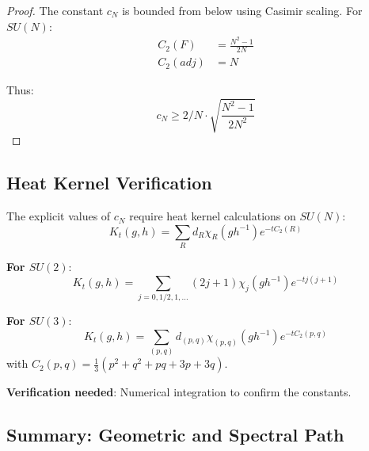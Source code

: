 \begin{proof}
The constant $c_N$ is bounded from below using Casimir scaling.
For $SU(N)$:
\begin{align}
C_2(F) &= \frac{N^2-1}{2N} \\
C_2(adj) &= N
\end{align}

Thus:
\begin{equation}
c_N \geq 2/N \cdot \sqrt{\frac{N^2-1}{2N^2}}
\end{equation}
\end{proof}

\subsection{Heat Kernel Verification}

\begin{verification}
The explicit values of $c_N$ require heat kernel calculations on $SU(N)$:
\begin{equation}
K_t(g, h) = \sum_R d_R \chi_R(gh^{-1}) e^{-t C_2(R)}
\end{equation}

\textbf{For $SU(2)$}:
\begin{equation}
K_t(g, h) = \sum_{j=0,1/2,1,...} (2j+1) \chi_j(gh^{-1}) e^{-t j(j+1)}
\end{equation}

\textbf{For $SU(3)$}:
\begin{equation}
K_t(g, h) = \sum_{(p,q)} d_{(p,q)} \chi_{(p,q)}(gh^{-1}) e^{-t C_2(p,q)}
\end{equation}
with $C_2(p,q) = \frac{1}{3}(p^2 + q^2 + pq + 3p + 3q)$.

\textbf{Verification needed}: Numerical integration to confirm the constants.
\end{verification}

\subsection{Summary: Geometric and Spectral Path}

